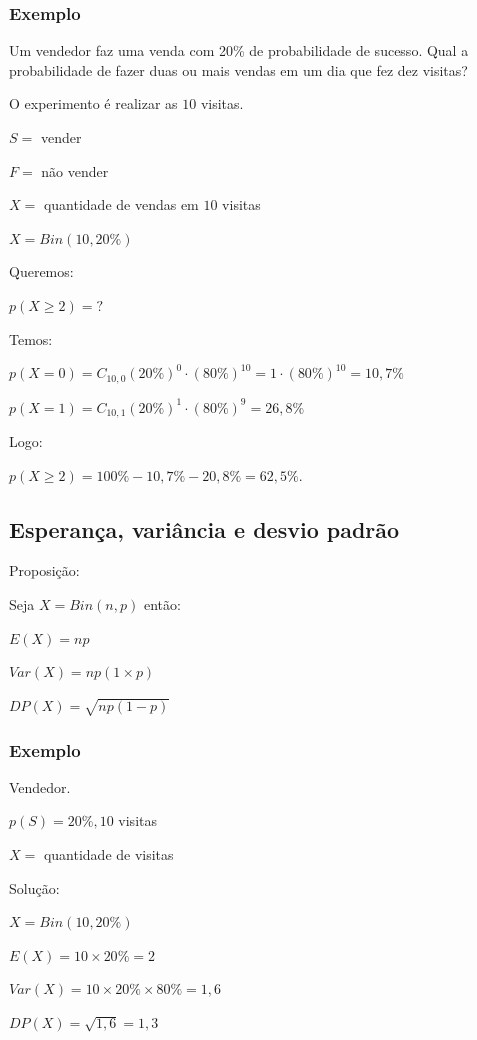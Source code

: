 \documentclass[a4paper]{article}
\begin{document}
	\subsubsection{Exemplo}
	
	Um vendedor faz uma venda com 20\% de probabilidade de sucesso. Qual a probabilidade de fazer duas ou mais vendas em um dia que fez dez visitas?
	
	O experimento é realizar as $10$ visitas.
	
	$S =$ vender
	
	$F =$ não vender
	
	$X =$ quantidade de vendas em $10$ visitas
	
	$X = Bin(10,20\%)$
	
	Queremos:
	
	$p(X \geq 2) = ?$
	
	Temos: 
	
	$p(X=0) = C_{10,0} (20\%)^0 \cdot (80\%)^{10} = 1 \cdot (80\%)^{10} = 10,7\%$
	
	$p(X=1)=C_{10,1} (20\%)^1 \cdot (80\%)^9 = 26,8\%$
	
	Logo: 
	
	$p(X \geq 2) = 100\% - 10,7\% - 20,8\% = 62,5\%$.
	
	\subsection{Esperança, variância e desvio padrão}
	
	Proposição:
	
	Seja $X = Bin(n,p)$ então:
	
	$E(X) = np$
	
	$Var(X) = np(1\times p)$
	
	$DP(X) = \sqrt{np(1-p)}$
	
	\subsubsection{Exemplo}
	
	Vendedor.
	
	$p(S) = 20\%, 10$ visitas
	
	$X =$ quantidade de visitas
	
	Solução:
	
	$X = Bin(10,20\%)$
	
	$E(X) = 10 \times 20\% = 2$
	
	$Var(X) = 10 \times 20\% \times 80\% = 1,6$
	
	$DP(X) = \sqrt{1,6} = 1,3$
	
\end{document}
